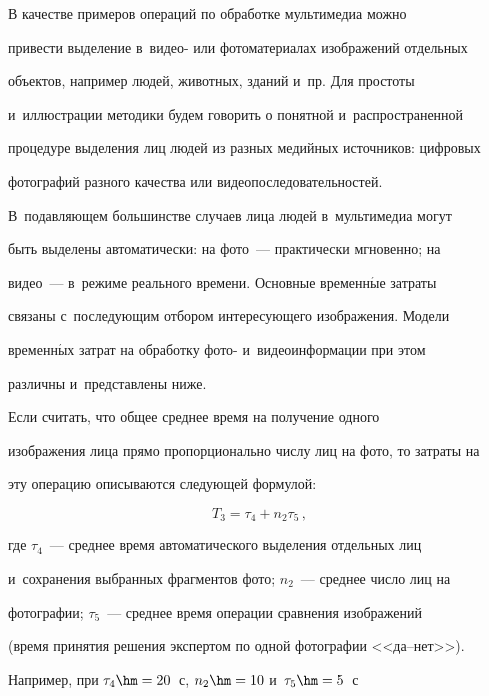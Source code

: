       


      В качестве примеров операций по обработке мультимедиа можно 


привести выделение в~видео- или фотоматериалах изображений отдельных 


объектов, например людей, животных, зданий и~пр. Для простоты 


и~иллюстрации методики будем говорить о понятной и~распространенной 


процедуре выделения лиц людей из разных медийных источников: цифровых 


фотографий разного качества или видеопоследовательностей. 


В~подавляющем большинстве случаев лица людей в~мультимедиа могут 


быть выделены автоматически: на фото~--- практически мгновенно; на 


видео~--- в~режиме реального времени. Основные временн$\acute{\mbox{ы}}$е затраты 


связаны с~последующим отбором интересующего изображения. Модели 


временн$\acute{\mbox{ы}}$х затрат на обработку фото- и~видеоинформации при этом 


различны и~представлены ниже.


      


      Если считать, что общее среднее время на получение одного 


изображения лица прямо пропорционально числу лиц на фото, то затраты на 


эту операцию описываются следующей формулой:


      \begin{equation}


      T_3=\tau_4+n_2\tau_5\,,


      \label{e5-bor}


      \end{equation}


где $\tau_4$~--- среднее время автоматического выделения отдельных лиц 


и~сохранения выбранных фрагментов фото; $n_2$~--- среднее число лиц на 


фотографии; $\tau_5$~--- среднее время операции сравнения изображений 


(время принятия решения экспертом по одной фотографии <<да--нет>>). 


Например, при $\tau_4\hm = 20$~с, $n_2\hm = 10$ и~$\tau_5\hm = 5$~с 


